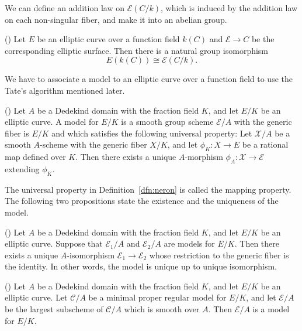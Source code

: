 \documentclass[main]{subfiles}
\begin{document}
We can define an addition law on $\mathcal{E}(C/k)$, which is induced by the addition law on each non-singular fiber, and make it into an abelian group.
\begin{prop}{(\cite[Proposition III.3.10. (c)]{ref:advancedaec})}
    Let $E$ be an elliptic curve over a function field $k(C)$ and $\mathcal{E} \to C$ be the corresponding elliptic surface.
    Then there is a natural group isomorphism
    \begin{equation*}
        E(k(C)) \cong \mathcal{E}(C/k).
    \end{equation*}
\end{prop}


We have to associate a \Neron{} model to an elliptic curve over a function field to use the Tate's algorithm mentioned later.

\begin{dfn}{(\cite[IV\S 5 Definition]{ref:advancedaec})}
    \label{dfn:neron}
    Let $A$ be a Dedekind domain with the fraction field $K$, and let $E/K$ be an elliptic curve.
    A \Neron{} model for $E/K$ is a smooth group scheme $\mathcal{E}/A$ with the generic fiber is $E/K$ and which satisfies the following universal property:
    Let $\mathcal{X}/A$ be a smooth $A$-scheme with the generic fiber $X/K$, and let $\phi_K: X \to E$ be a rational map defined over $K$.
    Then there exists a unique $A$-morphism $\phi_A: \mathcal{X} \to \mathcal{E}$ extending $\phi_K$.
\end{dfn}
The universal property in Definition~\ref{dfn:neron} is called the \Neron{} mapping property.
The following two propositions state the existence and the uniqueness of the \Neron{} model.
\begin{prop}{(\cite[Proposition IV.5.2. (a)]{ref:advancedaec})}
    Let $A$ be a Dedekind domain with the fraction field $K$, and let $E/K$ be an elliptic curve.
    Suppose that $\mathcal{E}_1/A$ and $\mathcal{E}_2/A$ are \Neron{} models for $E/K$.
    Then there exists a unique $A$-isomorphism $\mathcal{E}_1 \to \mathcal{E}_2$ whose restriction to the generic fiber is the identity.
    In other words, the \Neron{} model is unique up to unique isomorphism.
\end{prop}

\begin{prop}{(\cite[Theorem IV.6.1.]{ref:advancedaec})}
    Let $A$ be a Dedekind domain with the fraction field $K$, and let $E/K$ be an elliptic curve.
    Let $\mathcal{C}/A$ be a minimal proper regular model for $E/K$, and let $\mathcal{E}/A$ be the largest subscheme of $\mathcal{C}/A$ which is smooth over $A$.
    Then $\mathcal{E}/A$ is a \Neron{} model for $E/K$.
\end{prop}
\end{document}
